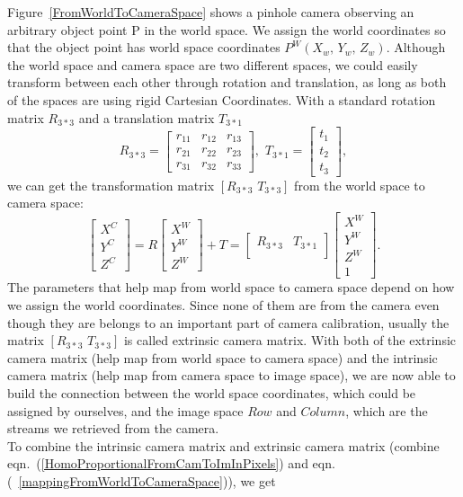 Figure~\ref{FromWorldToCameraSpace} shows a pinhole camera observing an arbitrary object point P in the world  space. We assign the world coordinates so that the object point has world space coordinates \(P^W(X_w, \, Y_w, \, Z_w)\). Although the world space and camera space are two different spaces, we could easily transform between each other through rotation and translation, as long as both of the spaces are using rigid Cartesian Coordinates. With a standard rotation matrix \(R_{3*3}\) and a translation matrix \(T_{3*1}\)
%
\begin{equation}
R_{3*3}%
=  \begin{bmatrix} 
r_{11} & r_{12} & r_{13} \\
r_{21} & r_{22} & r_{23} \\
r_{31} & r_{32} & r_{33}
 \end{bmatrix}%
, \, \, 
T_{3*1}%
=  \begin{bmatrix} 
t_{1} \\
t_{2} \\
t_{3}
 \end{bmatrix} ,%
\label{rotationTranslationMatrixRT}
\end{equation}%
%
we can get the transformation matrix \([R_{3*3} \,\, T_{3*3}]\) from the world space to camera space:
%
\begin{equation}
\begin{bmatrix} 
X^{C} \\
Y^{C} \\
Z^{C}
 \end{bmatrix}%
=  R \begin{bmatrix} 
X^{W} \\
Y^{W} \\
Z^{W}
 \end{bmatrix}%
 + T
=
\begin{bmatrix} 
R_{3*3} & T_{3*1} \\
\end{bmatrix}%
 \begin{bmatrix} 
X^{W} \\
Y^{W} \\
Z^{W} \\
1
 \end{bmatrix}  .%
\label{mappingFromWorldToCameraSpace}
\end{equation}%
%
%
\noindent
The parameters that help map from world space to camera space depend on how we assign the world coordinates. Since none of them are from the camera even though they are belongs to an important part of camera calibration, usually the matrix \([R_{3*3} \,\, T_{3*3}]\) is called extrinsic camera matrix. With both of the extrinsic camera matrix (help map from world space to camera space) and the intrinsic camera matrix (help map from camera space to image space), we are now able to build the connection between the world space coordinates, which could be assigned by ourselves, and the image space \(Row\) and \(Column\), which are the streams we retrieved from the camera. 
\\\indent
To combine the intrinsic camera matrix and extrinsic camera matrix (combine eqn.~(\ref{HomoProportionalFromCamToImInPixels}) and eqn.(~\ref{mappingFromWorldToCameraSpace})), we get 

